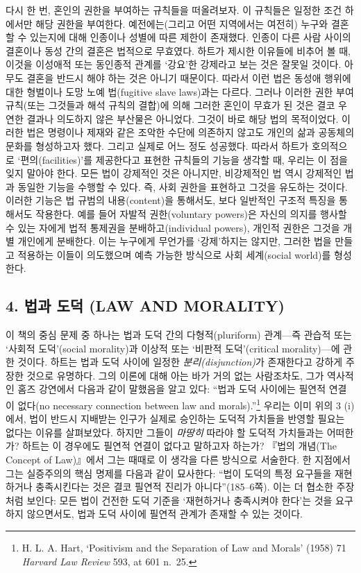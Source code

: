 \documentclass[12pt, oneside]{book}  %
\begin{document}
다시 한 번, 혼인의 권한을 부여하는 규칙들을 떠올려보자. 이 규칙들은
일정한 조건 하에서만 해당 권한을 부여한다. 예전에는(그리고 어떤
지역에서는 여전히) 누구와 결혼할 수 있는지에 대해 인종이나 성별에 따른
제한이 존재했다. 인종이 다른 사람 사이의 결혼이나 동성 간의 결혼은
법적으로 무효였다. 하트가 제시한 이유들에 비추어 볼 때, 이것을 이성애적
또는 동인종적 관계를 `강요'한 강제라고 보는 것은 잘못일 것이다. 아무도
결혼을 반드시 해야 하는 것은 아니기 때문이다. 따라서 이런 법은 동성애
행위에 대한 형벌이나 도망 노예 법(fugitive slave laws)과는 다르다.
그러나 이러한 권한 부여 규칙(또는 그것들과 해석 규칙의 결합)에 의해
그러한 혼인이 무효가 된 것은 결코 우연한 결과나 의도하지 않은 부산물은
아니었다. 그것이 바로 해당 법의 목적이었다. 이러한 법은 명령이나 제재와
같은 조악한 수단에 의존하지 않고도 개인의 삶과 공동체의 문화를
형성하고자 했다. 그리고 실제로 어느 정도 성공했다. 따라서 하트가
호의적으로 `편의(facilities)'를 제공한다고 표현한 규칙들의 기능을 생각할
때, 우리는 이 점을 잊지 말아야 한다. 모든 법이 강제적인 것은 아니지만,
비강제적인 법 역시 강제적인 법과 동일한 기능을 수행할 수 있다. 즉, 사회
권한을 표현하고 그것을 유도하는 것이다. 이러한 기능은 법 규범의
내용(content)을 통해서도, 보다 일반적인 구조적 특징을 통해서도 작용한다.
예를 들어 자발적 권한(voluntary powers)은 자신의 의지를 행사할 수 있는
자에게 법적 통제권을 분배하고(individual powers), 개인적 권한은 그것을
개별 개인에게 분배한다. 이는 누구에게 무언가를 `강제'하지는 않지만,
그러한 법을 만들고 적용하는 이들이 의도했으며 예측 가능한 방식으로 사회
세계(social world)를 형성한다.

\subsection{\texorpdfstring{\textbf{4. 법과 도덕 (LAW AND
MORALITY)}}{4. 법과 도덕 (LAW AND MORALITY)}}\label{uxbc95uxacfc-uxb3c4uxb355-law-and-morality}

이 책의 중심 문제 중 하나는 법과 도덕 간의 다형적(pluriform) 관계---즉
관습적 또는 `사회적 도덕'(social morality)과 이상적 또는 `비판적
도덕'(critical morality)---에 관한 것이다. 하트는 법과 도덕 사이에
일정한 \emph{분리(disjunction)}가 존재한다고 강하게 주장한 것으로
유명하다. 그의 이론에 대해 아는 바가 거의 없는 사람조차도, 그가 역사적인
홈즈 강연에서 다음과 같이 말했음을 알고 있다: ``법과 도덕 사이에는
필연적 연결이 없다(no necessary connection between law and
morals).''\footnote{H. L. A. Hart, `Positivism and the Separation of Law
  and Morals' (1958) 71 \emph{Harvard Law Review} 593, at 601 n.~25.}
우리는 이미 위의 3 (i)에서, 법이 반드시 지배받는 인구가 실제로 승인하는
도덕적 가치들을 반영할 필요는 없다는 이유를 살펴보았다. 하지만 그들이
\emph{마땅히} 따라야 할 도덕적 가치들과는 어떠한가? 하트는 이 경우에도
필연적 연결이 없다고 말하고자 하는가? 『법의 개념(The Concept of
Law)』에서 그는 때때로 이 생각을 다른 방식으로 서술한다. 한 지점에서
그는 실증주의의 핵심 명제를 다음과 같이 묘사한다: ``법이 도덕의 특정
요구들을 재현하거나 충족시킨다는 것은 결코 필연적 진리가
아니다''(185--6쪽). 이는 더 협소한 주장처럼 보인다: 모든 법이 건전한
도덕 기준을 `재현하거나 충족시켜야 한다'는 것을 요구하지 않으면서도,
법과 도덕 사이에 필연적 관계가 존재할 수 있는 것이다.
\end{document}
